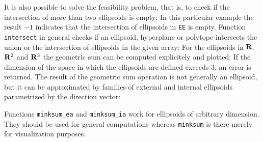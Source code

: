 \documentclass{report}
\begin{document}
It is also possible to solve the feasibility problem, that is, to check
if the intersection of more than two ellipsoids is empty:
In this particular example the result $-1$ indicates that the intersection
of ellipsoids in {\tt EE} is empty.
Function {\tt intersect} in general checks if an ellipsoid,
hyperplane or polytope intersects the union or the intersection
of ellipsoids in the given array:
For the ellipsoids in ${\bf R}$, ${\bf R}^2$ and ${\bf R}^3$ the geometric
sum can be computed explicitely and plotted:
If the dimension of the space in which the ellipsoids are defined exceeds $3$,
an error is returned. The result of the geometric sum operation is
not generally an ellipsoid, but it can be approximated by families
of external and internal ellipsoids parametrized by the direction vector:

Functions {\tt minksum\_ea} and {\tt minksum\_ia} work for ellipsoids of
arbitrary dimension. They should be used for general computations
whereas {\tt minksum} is there merely for visualization purposes.
\end{document}
